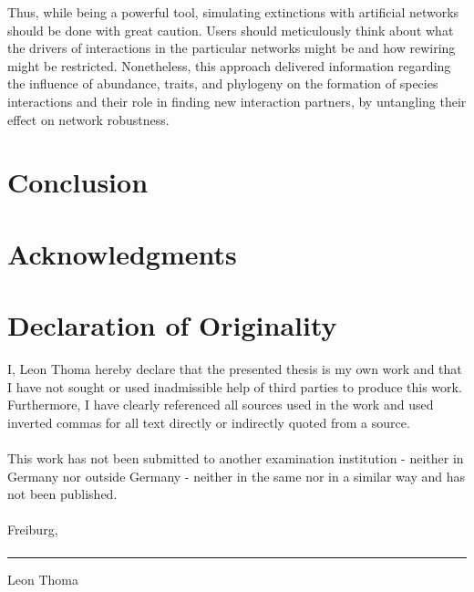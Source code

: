 \documentclass[12pt,a4paper]{article}
\begin{document}
Thus, while being a powerful tool, simulating extinctions with artificial networks should be done with great caution. Users should meticulously think about what the drivers of interactions in the particular networks might be and how rewiring might be restricted. Nonetheless, this approach delivered information regarding the influence of abundance, traits, and phylogeny on the formation of species interactions and their role in finding new interaction partners, by untangling their effect on network robustness.
\section{Conclusion}
\section{Acknowledgments}
\newpage
\section*{Declaration of Originality}
I, Leon Thoma hereby declare that the presented thesis is my own work and that I have not sought or used inadmissible help of third parties to produce this work. Furthermore, I have clearly referenced all sources used in the work and used inverted commas for all text directly or indirectly quoted from a source.\paragraph{}
This work has not been submitted to another examination institution - neither in Germany nor outside Germany - neither in the same nor in a similar way and has not been published.\paragraph{}

Freiburg,\paragraph{}

\rule{5cm}{.4pt}\par
Leon Thoma
\newpage
\end{document}
